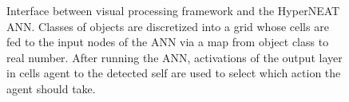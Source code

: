 \documentclass{acm_proc_article-sp}
\begin{document}
\begin{figure}
  \centering
  \hspace{.1in}
  \hspace{.1in}
  \hspace{.1in}
 \caption{Interface between visual processing framework and the HyperNEAT ANN. Classes of objects are discretized into a grid whose cells are fed to the input nodes of the ANN via a map from object class to real number. After running the ANN, activations of the output layer in cells agent to the detected self are used to select which action the agent should take.}
 \label{fig:interface}
\end{figure}
\end{document}
